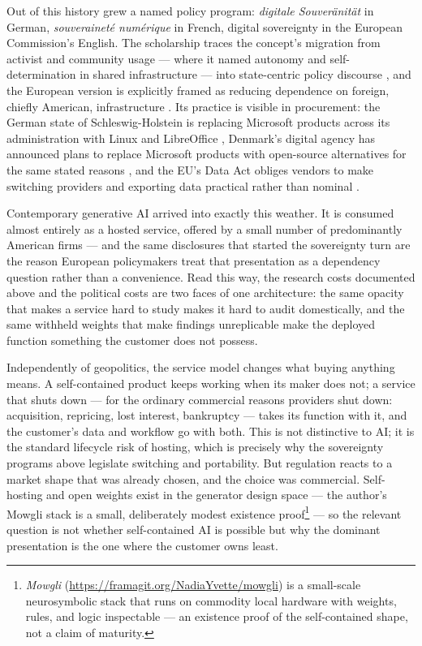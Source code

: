 \documentclass[11pt,a4paper]{article}
\begin{document}
Out of this history grew a named policy program: \emph{digitale Souveränität}
in German, \emph{souveraineté numérique} in French, digital sovereignty in the
European Commission's English. The scholarship traces the concept's migration
from activist and community usage --- where it named autonomy and
self-determination in shared infrastructure --- into state-centric policy
discourse \autocite{couture2019sovereignty}, and the European version is
explicitly framed as reducing dependence on foreign, chiefly American,
infrastructure \autocite{pohle2020sovereignty}. Its practice is visible in
procurement: the German state of Schleswig-Holstein is replacing Microsoft
products across its administration with Linux and LibreOffice
\autocite{osor2026schleswig}, Denmark's digital agency has announced plans to
replace Microsoft products with open-source alternatives for the same stated
reasons \autocite{denmark2025open}, and the EU's Data Act obliges vendors to
make switching providers and exporting data practical rather than nominal
\autocite{eu2023dataact}.

Contemporary generative AI arrived into exactly this weather. It is consumed
almost entirely as a hosted service, offered by a small number of
predominantly American firms --- and the same disclosures that started the
sovereignty turn are the reason European policymakers treat that presentation
as a dependency question rather than a convenience. Read this way, the
research costs documented above and the political costs are two faces of one
architecture: the same opacity that makes a service hard to study makes it
hard to audit domestically, and the same withheld weights that make findings
unreplicable make the deployed function something the customer does not
possess.

Independently of geopolitics, the service model changes what buying anything
means. A self-contained product keeps working when its maker does not; a
service that shuts down --- for the ordinary commercial reasons providers shut
down: acquisition, repricing, lost interest, bankruptcy --- takes its function
with it, and the customer's data and workflow go with both. This is not
distinctive to AI; it is the standard lifecycle risk of hosting, which is
precisely why the sovereignty programs above legislate switching and
portability. But regulation reacts to a market shape that was already chosen,
and the choice was commercial. Self-hosting and open weights exist in the
generator design space --- the author's Mowgli stack is a small, deliberately
modest existence proof\footnote{\emph{Mowgli}
(\url{https://framagit.org/NadiaYvette/mowgli}) is a small-scale neurosymbolic
stack that runs on commodity local hardware with weights, rules, and logic
inspectable --- an existence proof of the self-contained shape, not a claim of
maturity.} --- so the relevant question is not whether self-contained AI is
possible but why the dominant presentation is the one where the customer owns
least.
\end{document}
